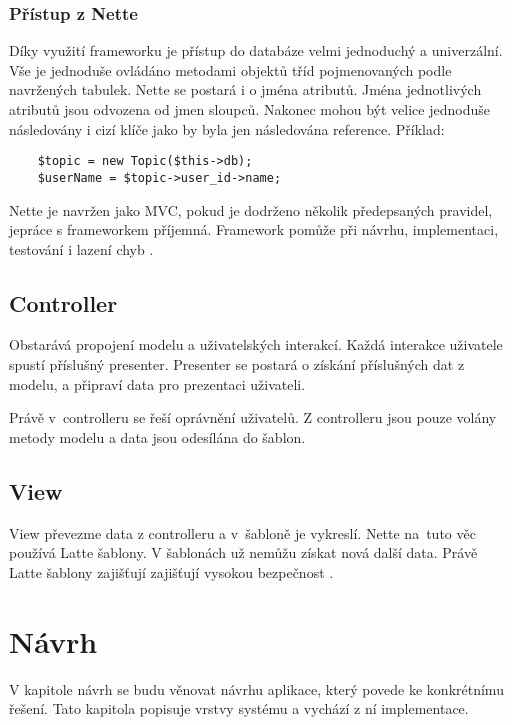 \documentclass[thesis=B,czech]{FITthesis}[2012/06/26]
\begin{document}
\subsection{Přístup z Nette}

Díky využití frameworku je přístup do databáze velmi jednoduchý a univerzální. Vše je jednoduše ovládáno metodami objektů tříd pojmenovaných podle navržených tabulek. Nette se postará i o jména atributů. Jména jednotlivých atributů jsou odvozena od jmen sloupců. Nakonec mohou být velice jednoduše následovány i cizí klíče jako by byla jen následována reference. Příklad:

\begin{verbatim}
	$topic = new Topic($this->db);
	$userName = $topic->user_id->name;
\end{verbatim}

Nette je navržen jako MVC, pokud je dodrženo několik předepsaných pravidel, jepráce s frameworkem příjemná. Framework pomůže při návrhu, implementaci, testování i lazení chyb \cite{nette}.

\section{Controller}
Obstarává propojení modelu a uživatelských interakcí. Každá interakce uživatele spustí příslušný presenter. Presenter se postará o získání příslušných dat z modelu, a připraví data pro prezentaci uživateli.

Právě v~controlleru se řeší oprávnění uživatelů. Z controlleru jsou pouze volány metody modelu a data jsou odesílána do šablon.

\section{View}

View převezme data z controlleru a v~šabloně je vykreslí. Nette na~tuto věc používá Latte šablony. V šablonách už nemůžu získat nová další data. Právě Latte šablony zajišťují zajišťují vysokou bezpečnost \cite{phpfashion}.


\chapter{Návrh}
V kapitole návrh se budu věnovat návrhu aplikace, který povede ke konkrétnímu řešení. Tato kapitola popisuje vrstvy systému a vychází z ní implementace.
\end{document}
